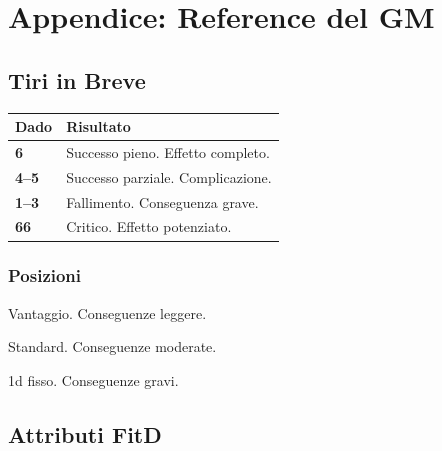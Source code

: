
\chapter{Appendice: Reference del GM}
\label{ch:appendice}

\begin{multicols}{2}

\section{Tiri in Breve}
\label{sec:ref-tiri}

\begin{center}
\begin{tabular}{C{1.2cm} p{5cm}}
  \toprule
  \textbf{Dado} & \textbf{Risultato} \\
  \midrule
  \textbf{6}   & Successo pieno. Effetto completo. \\
  \textbf{4–5} & Successo parziale. Complicazione. \\
  \textbf{1–3} & Fallimento. Conseguenza grave. \\
  \textbf{66}  & Critico. Effetto potenziato. \\
  \bottomrule
\end{tabular}
\end{center}

\subsection{Posizioni}
\begin{description}[leftmargin=3cm, style=nextline]
  \item[\idx{Controllata}]  Vantaggio. Conseguenze leggere.
  \item[\idx{Rischiosa}]    Standard. Conseguenze moderate.
  \item[\idx{Disperata}]    1d fisso. Conseguenze gravi.
\end{description}

\columnbreak

\section{Attributi FitD}
\label{sec:ref-attributi}


\end{multicols}
